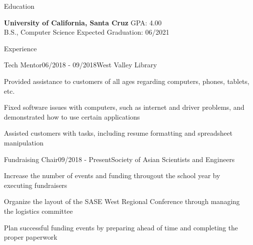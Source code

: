 \documentclass{resume}
\begin{document}
\begin{rSection}{Education}

{\bf University of California, Santa Cruz} \hfill {GPA: 4.00} 
\\ B.S., Computer Science \hfill {Expected Graduation: 06/2021}

\end{rSection}


\begin{rSection}{Experience}

\begin{rSubsection}{Tech Mentor}{06/2018 - 09/2018}{West Valley Library}{}
\item Provided assistance to customers of all ages regarding computers, phones, tablets, etc.
\item Fixed software issues with computers, such as internet and driver problems, and demonstrated how to use certain applications
\item Assisted customers with tasks, including resume formatting and spreadsheet manipulation
\end{rSubsection}

\begin{rSubsection}{Fundraising Chair}{09/2018 - Present}{Society of Asian Scientists and Engineers}{}
\item Increase the number of events and funding througout the school year by executing fundraisers
\item Organize the layout of the SASE West Regional Conference through managing the logistics committee
\item Plan successful funding events by preparing ahead of time and completing the proper paperwork
\end{rSubsection}

\end{rSection}
\end{document}

